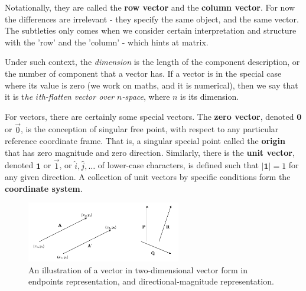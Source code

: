 Notationally, they are called the \textbf{row vector} and the \textbf{column vector}. For now the differences are irrelevant - they specify the same object, and the same vector. The subtleties only comes when we consider certain interpretation and structure with the 'row' and the 'column' - which hints at matrix. 

Under such context, the \textit{dimension} is the length of the component description, or the number of component that a vector has. If a vector is in the special case where its value is zero (we work on maths, and it is numerical), then we say that it is t\textit{he $i$th-flatten vector over $n$-space}, where $n$ is its dimension. 

For vectors, there are certainly some special vectors. The \textbf{zero vector}, denoted $\mathbf{0}$ or $\vec{0}$, is the conception of singular free point, with respect to any particular reference coordinate frame. That is, a singular special point called the \textbf{origin} that has zero magnitude and zero direction. Similarly, there is the \textbf{unit vector}, denoted $\mathbf{1}$ or $\vec{1}$, or $\hat{i},\hat{j},\dots$ of lower-case characters, is defined such that $\lvert \mathbf{1}\rvert = 1$ for any given direction. A collection of unit vectors by specific conditions form the \textbf{coordinate system}. 

\begin{figure}[h!]
    \centering
    \includegraphics[width=0.6\textwidth]{img/vector1.png}
    \caption{An illustration of a vector in two-dimensional vector form in endpoints representation, and directional-magnitude representation.}
    \label{fig:vector1}
\end{figure}

